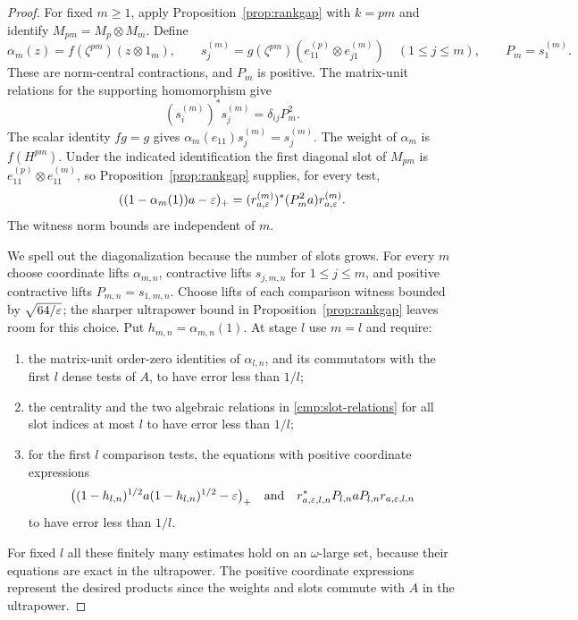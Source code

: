 \begin{proof}
For fixed $m\ge1$, apply Proposition~\ref{prop:rankgap} with $k=pm$
and identify $M_{pm}=M_p\otimes M_m$.  Define
\[
 \alpha_m(z)=f(\zeta^{pm})(z\otimes1_m),\qquad
 s_j^{(m)}=g(\zeta^{pm})(e_{11}^{(p)}\otimes e_{j1}^{(m)})
       \quad(1\le j\le m),
 \qquad P_m=s_1^{(m)}.
\]
These are norm-central contractions, and $P_m$ is positive.
The matrix-unit relations for the supporting homomorphism give
\[
 (s_i^{(m)})^*s_j^{(m)}=\delta_{ij}P_m^2.
\]
The scalar identity $fg=g$ gives
$\alpha_m(e_{11})s_j^{(m)}=s_j^{(m)}$.
The weight of $\alpha_m$ is $f(H^{pm})$.  Under the indicated
identification the first diagonal slot of $M_{pm}$ is
$e_{11}^{(p)}\otimes e_{11}^{(m)}$, so
Proposition~\ref{prop:rankgap} supplies, for every test,
\[
 ((1-\alpha_m(1))a-\varepsilon)_+
       =(r_{a,\varepsilon}^{(m)})^*(P_m^2a)r_{a,\varepsilon}^{(m)}.
\]
The witness norm bounds are independent of $m$.

We spell out the diagonalization because the number of slots grows.
For every $m$ choose \cpc coordinate lifts $\alpha_{m,n}$, contractive
lifts $s_{j,m,n}$ for $1\le j\le m$, and positive contractive lifts
$P_{m,n}=s_{1,m,n}$.  Choose lifts of each comparison witness bounded
by $\sqrt{64/\varepsilon}$; the sharper ultrapower bound in
Proposition~\ref{prop:rankgap} leaves room for this choice.  Put
$h_{m,n}=\alpha_{m,n}(1)$.  At stage $l$ use $m=l$ and require:
\begin{enumerate}
 \item the matrix-unit order-zero identities of $\alpha_{l,n}$,
       and its commutators with the first $l$ dense tests of $A$,
       to have error less than $1/l$;
 \item the centrality and the two algebraic relations in
       \eqref{cmp:slot-relations} for all slot indices at most $l$
       to have error less than $1/l$;
 \item for the first $l$ comparison tests, the equations with
       positive coordinate expressions
       \[
       \bigl((1-h_{l,n})^{1/2}a(1-h_{l,n})^{1/2}-\varepsilon\bigr)_+
       \quad\text{and}\quad
       r_{a,\varepsilon,l,n}^*P_{l,n}aP_{l,n}r_{a,\varepsilon,l,n}
       \]
       to have error less than $1/l$.
\end{enumerate}
For fixed $l$ all these finitely many estimates hold on an
$\omega$-large set, because their equations are exact in the
ultrapower.  The positive coordinate expressions represent the
desired products since the weights and slots commute with $A$ in
the ultrapower.


\end{proof}
